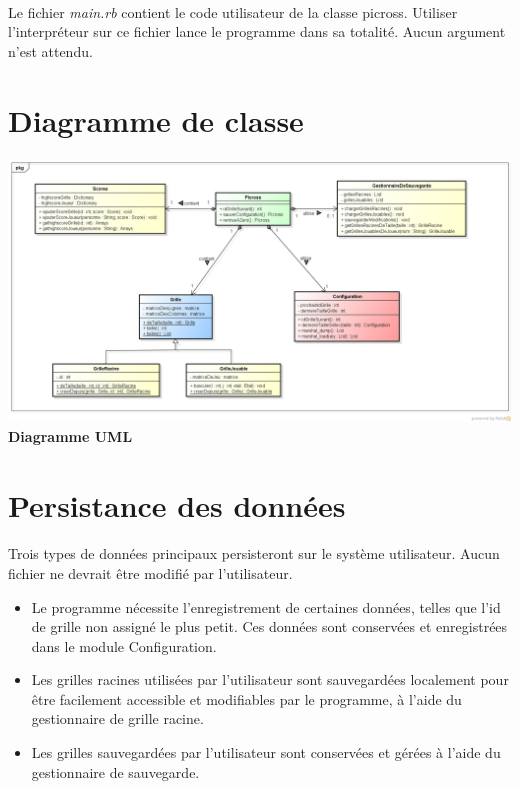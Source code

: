         \paragraph*{}
        Le fichier \textit{main.rb} contient le code utilisateur de la classe picross. Utiliser l'interpréteur sur ce fichier lance le programme dans  sa totalité.
	Aucun argument n'est attendu.

\section{Diagramme de classe}
        \paragraph*{}
 
 	\begin{center}
        	\includegraphics[scale=0.35]{data/UMLDiagram.png}\\
        	\textbf{Diagramme UML}
	\end{center}
\newpage 


\section{Persistance des données}
        \paragraph*{}
         Trois types de données principaux persisteront sur le système utilisateur. Aucun fichier ne devrait être modifié par l'utilisateur.
        \begin{itemize}
		\item Le programme nécessite l'enregistrement de certaines données, telles que l'id de grille non assigné le plus petit.
		Ces données sont conservées et enregistrées dans le module Configuration.
		\item Les grilles racines utilisées par l'utilisateur sont sauvegardées localement pour être facilement accessible 
		et modifiables par le programme, à l'aide du gestionnaire de grille racine.
		\item Les grilles sauvegardées par l'utilisateur sont conservées et gérées à l'aide du gestionnaire de sauvegarde.
        \end{itemize}




